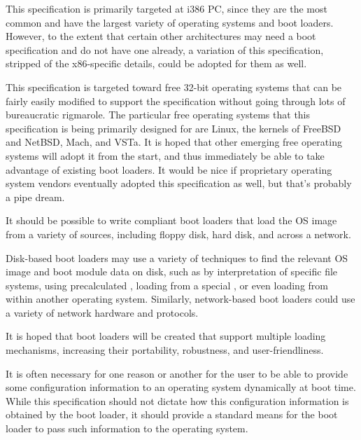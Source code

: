 
This specification is primarily targeted at i386 PC, since they are the most
common and have the largest variety of operating systems and boot loaders.
However, to the extent that certain other architectures may need a boot
specification and do not have one already, a variation of this specification,
stripped of the x86-specific details, could be adopted for them as well.


This specification is targeted toward free 32-bit operating systems that can be
fairly easily modified to support the specification without going through lots
of bureaucratic rigmarole. The particular free operating systems that this
specification is being primarily designed for are Linux, the kernels of FreeBSD
and NetBSD, Mach, and VSTa. It is hoped that other emerging free operating
systems will adopt it from the start, and thus immediately be able to take
advantage of existing boot loaders. It would be nice if proprietary operating
system vendors eventually adopted this specification as well, but that's
probably a pipe dream.


It should be possible to write compliant boot loaders that load the OS image
from a variety of sources, including floppy disk, hard disk, and across a
network.

Disk-based boot loaders may use a variety of techniques to find the relevant OS
image and boot module data on disk, such as by interpretation of specific file
systems, using precalculated
, loading from a special , or even
loading from within another operating system.
Similarly, network-based boot loaders could use a variety of network hardware
and protocols.

It is hoped that boot loaders will be created that support multiple loading
mechanisms, increasing their portability, robustness, and user-friendliness.


It is often necessary for one reason or another for the user to be able to
provide some configuration information to an operating system dynamically at
boot time. While this specification should not dictate how this configuration
information is obtained by the boot loader, it should provide a standard means
for the boot loader to pass such information to the operating system.

